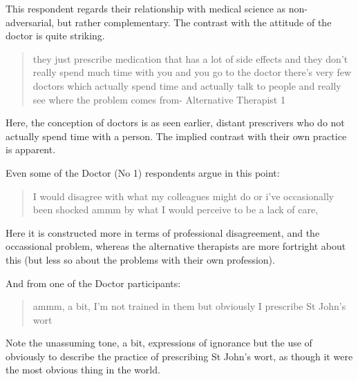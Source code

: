 This respondent regards their relationship with medical science as non-adversarial, but rather complementary. The contrast with the attitude of the doctor is quite striking. 


\begin{quotation}
  they just prescribe medication that has a lot of side effects and they don't really spend much time with you and you go to the doctor there's very few doctors which actually spend time and actually talk to people and really see where the problem comes from-
Alternative Therapist 1
\end{quotation}

Here, the conception of doctors is as seen earlier, distant prescrivers who do not actually spend time with a person. The implied contrast with their own practice is apparent. 

Even some of the Doctor (No 1) respondents argue in this point:

\begin{quotation}
  I would disagree with what my colleagues might do or i've occasionally been shocked ammm by what I would perceive to be a lack of care,

\end{quotation}

Here it is constructed more in terms of professional disagreement, and the occassional problem, whereas the alternative therapists are more fortright about this (but less so about the problems with their own profession). 

And from one of the Doctor participants: 

\begin{quotation}
  ammm, a bit, I'm not trained in them but obviously I prescribe St John's wort

\end{quotation}

Note the unassuming tone, a bit, expressions of ignorance but the use of obviously to describe the practice of prescribing St John's wort, as though it were the most obvious thing in the world. 
